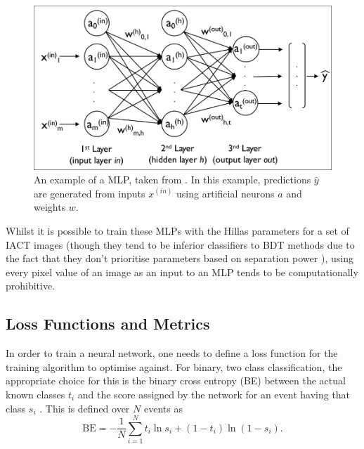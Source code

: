 \begin{figure}[ht] 
        \centering \includegraphics[width=0.6\columnwidth]{figures/MLP.jpeg}
        \caption{
                \label{fig:mlp} %
                An example of a MLP, taken from \cite{newmlp}. In this example, predictions $\hat{y}$ are generated from inputs $x^{(in)}$ using artificial neurons $a$ and weights $w$.
        }
\end{figure}

Whilst it is possible to train these MLPs with the Hillas parameters for a set of IACT images (though they tend to be inferior classifiers to BDT methods due to the fact that they don't prioritise parameters based on separation power \cite{hessbdt}), 
using every pixel value of an image as an input to an MLP tends to be computationally prohibitive.

\subsection{Loss Functions and Metrics}
\label{MLdefs}
In order to train a neural network, one needs to define a loss function for the training algorithm to optimise against. For binary, two class classification, the appropriate choice for this is the  binary cross entropy (BE) between the actual known classes $t_i$ and the score assigned by the network for an event having that class $s_i$ \cite{Keras}. This is defined over $N$ events as
\begin{equation}
    \textrm{BE}=-\frac{1}{N}\sum_{i=1}^{N}t_i\ln{s_i}+(1-t_i)\ln{(1-s_i)}.
\end{equation}

